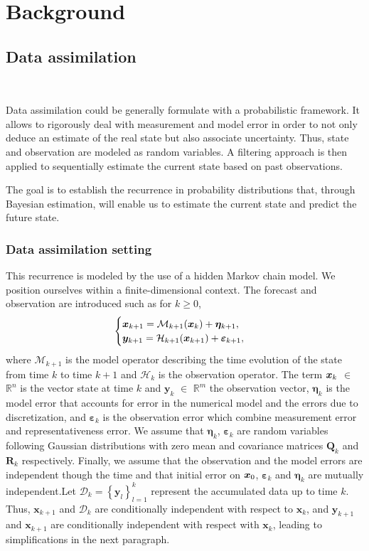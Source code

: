 
\section{Background}

\subsection{Data assimilation}~\label{Background_DA}

Data assimilation could be generally formulate with a probabilistic framework. It allows to rigorously deal with measurement and model error in order to not only deduce an estimate of the real state but also associate uncertainty. Thus, state and observation are modeled as random variables. A filtering approach is then applied to sequentially estimate the current state based on past observations.

The goal is to establish the recurrence in probability distributions that, through Bayesian estimation, will enable us to estimate the current state and predict the future state.


\subsubsection{Data assimilation setting}

This recurrence is modeled by the use of a hidden Markov chain model. We position ourselves within a finite-dimensional context. The forecast and observation are introduced such as for $ k \geq 0$,
\[
    \begin{cases}
        \bm{x}_{k+1} = \mathcal{M}_{k+1} (\bm{x}_{k}) + \bm{\eta}_{k+1}, \\
        \bm{y}_{k+1} = \mathcal{H}_{k+1} (\bm{x}_{k+1}) + \bm \varepsilon_{k+1},
    \end{cases}
\]where $\mathcal{M}_{k+1}$ is the model operator describing the time evolution of the state from time $k$ to time $k+1$ and $\mathcal{H}_k$ is the observation operator. The term $\bm{x}_k$ $\in$ $\mathbb{R}^n$ is the vector state at time $k$ and $\bm{y}_k$ $\in$ $\mathbb{R}^m$ the observation vector, $\bm{\eta}_{k}$ is the model error that accounts for error in the numerical model and the errors due to discretization, and $\bm{\varepsilon}_k$ is the observation error which combine measurement error and representativeness error. We assume that $\bm{\eta}_{k}$, $\bm{\varepsilon}_k$ are random variables following Gaussian distributions with zero mean and covariance matrices $\bm Q_k$ and $\bm R_k$ respectively. Finally, we assume that the observation and the model errors are independent though the time and that initial error on $\bm{x}_0$, $\bm{\varepsilon}_k$ and $\bm{\eta}_{k}$ are mutually independent.Let $\mathcal{D}_k = \left\{\bm y_l\right\}_{l=1}^k$ represent the accumulated data up to time $k$.
Thus, $\bm x_{k+1}$ and $\mathcal{D}_k$ are conditionally independent with respect to $\bm x_{k}$, and $\bm{y}_{k+1}$ and $\bm x_{k+1}$ are conditionally independent with respect with $\bm x_{k}$, leading to simplifications in the next paragraph.

